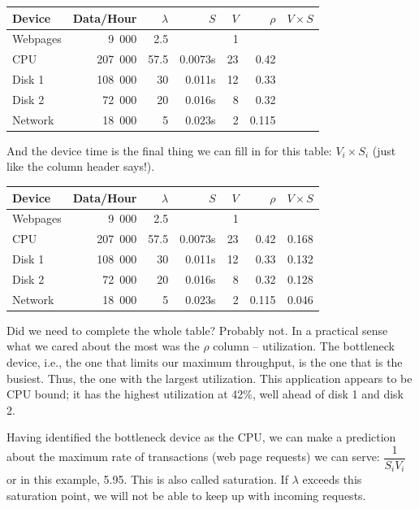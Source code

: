 \begin{center}
\begin{tabular}{l|r|r|r|r|r|r} 
	\textbf{Device} & \textbf{Data/Hour} & \textbf{$\lambda$} & \textbf{$S$} & \textbf{$V$} & \textbf{$\rho$} & \textbf{$V \times S$} \\ \hline
	Webpages & 9~000 & 2.5 & & 1 & & \\ \hline
	CPU & 207~000 & 57.5 & 0.0073s & 23 & 0.42 & \\ \hline
	Disk 1 & 108~000 & 30 & 0.011s  & 12& 0.33 &\\ \hline
	Disk 2 & 72~000 & 20 & 0.016s & 8 & 0.32 &\\ \hline
	Network & 18~000 & 5 & 0.023s & 2 & 0.115 &
\end{tabular}
\end{center}

And the device time is the final thing we can fill in for this table: $V_{i} \times S_{i}$ (just like the column header says!).

\begin{center}
\begin{tabular}{l|r|r|r|r|r|r}
	\textbf{Device} & \textbf{Data/Hour} & \textbf{$\lambda$} & \textbf{$S$} & \textbf{$V$} & \textbf{$\rho$} & \textbf{$V \times S$} \\ \hline
	Webpages & 9~000 & 2.5 & & 1 & & \\ \hline
	CPU & 207~000 & 57.5 & 0.0073s & 23 & 0.42 & 0.168\\ \hline
	Disk 1 & 108~000 & 30 & 0.011s  & 12& 0.33 & 0.132\\ \hline
	Disk 2 & 72~000 & 20 & 0.016s & 8 & 0.32 & 0.128\\ \hline
	Network & 18~000 & 5 & 0.023s & 2 & 0.115 & 0.046
\end{tabular}
\end{center}

Did we need to complete the whole table? Probably not. In a practical sense what we cared about the most was the $\rho$ column -- utilization. The bottleneck device, i.e., the one that limits our maximum throughput, is the one that is the busiest. Thus, the one with the largest utilization. This application appears to be CPU bound; it has the highest utilization at 42\%, well ahead of disk 1 and disk 2. 

Having identified the bottleneck device as the CPU, we can make a prediction about the maximum rate of transactions (web page requests) we can serve: $\dfrac{1}{S_{i}V_{i}}$ or in this example, 5.95. This is also called saturation. If $\lambda$ exceeds this saturation point, we will not be able to keep up with incoming requests.


